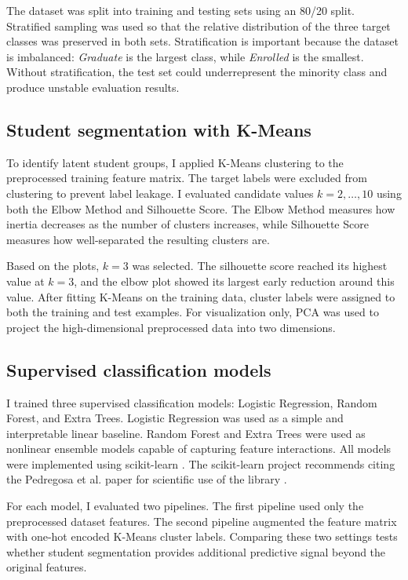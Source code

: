 \documentclass{article}
\begin{document}
The dataset was split into training and testing sets using an 80/20 split. Stratified sampling was used so that the relative distribution of the three target classes was preserved in both sets. Stratification is important because the dataset is imbalanced: \textit{Graduate} is the largest class, while \textit{Enrolled} is the smallest. Without stratification, the test set could underrepresent the minority class and produce unstable evaluation results.

\subsection{Student segmentation with K-Means}

To identify latent student groups, I applied K-Means clustering to the preprocessed training feature matrix. The target labels were excluded from clustering to prevent label leakage. I evaluated candidate values \(k = 2,\ldots,10\) using both the Elbow Method and Silhouette Score. The Elbow Method measures how inertia decreases as the number of clusters increases, while Silhouette Score measures how well-separated the resulting clusters are.

Based on the plots, \(k=3\) was selected. The silhouette score reached its highest value at \(k=3\), and the elbow plot showed its largest early reduction around this value. After fitting K-Means on the training data, cluster labels were assigned to both the training and test examples. For visualization only, PCA was used to project the high-dimensional preprocessed data into two dimensions.

\subsection{Supervised classification models}

I trained three supervised classification models: Logistic Regression, Random Forest, and Extra Trees. Logistic Regression was used as a simple and interpretable linear baseline. Random Forest and Extra Trees were used as nonlinear ensemble models capable of capturing feature interactions. All models were implemented using scikit-learn \citep{pedregosa2011scikit}. The scikit-learn project recommends citing the Pedregosa et al. paper for scientific use of the library \citep{pedregosa2011scikit}.

For each model, I evaluated two pipelines. The first pipeline used only the preprocessed dataset features. The second pipeline augmented the feature matrix with one-hot encoded K-Means cluster labels. Comparing these two settings tests whether student segmentation provides additional predictive signal beyond the original features.
\end{document}
